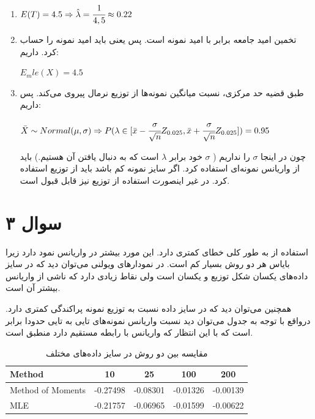 \documentclass[12pt]{article}
\begin{document}
\begin{enumerate}
	\item 
	\begin{latin}
		$
		E(T) = 4.5 \Rightarrow \hat{\lambda} = \cfrac{1}{4,5}  \approx 0.22
		$
	\end{latin}
	\item 
		تخمین امید جامعه برابر با امید نمونه است. پس یعنی باید امید نمونه را حساب کرد. داریم:
	\begin{latin}
		$
		E_mle(X) = 4.5
		$
	\end{latin}
	\item 
	طبق قضیه حد مرکزی، نسبت میانگین نمونه‌ها از توزیع نرمال پیروی می‌کند. پس داریم:
	\begin{latin}
		$
		\bar{X} \sim Normal(\mu, \sigma) \Rightarrow P(\lambda \in [\bar{x} - \cfrac{\sigma}{\sqrt{n}} Z_{0.025},  \bar{x} + \cfrac{\sigma}{\sqrt{n}} Z_{0.025}]) = 0.95
		$
	\end{latin}
	چون در اینجا 
	$\sigma$
	را نداریم (
	$\sigma$ خود برابر $\lambda$ است که به دنبال یافتن آن هستیم.)
	باید از واریانس نمونه‌ای استفاده کرد. اگر سایز نمونه کم باشد باید از توزیع 
	استفاده کرد. در غیر اینصورت استفاده از توزیع 
	نیز قابل قبول است.
\end{enumerate}
\section{سوال ۳}
استفاده از 
به طور کلی خطای کمتری دارد. این مورد بیشتر در واریانس نمود دارد زیرا بایاس هر دو روش بسیار کم است. در نمودارهای ویولنی می‌توان دید که در سایز داده‌های یکسان شکل توزیع 
و
یکسان است ولی 
نقاط 
زیادی دارد که ناشی از واریانس بیشتر آن است.

همچنین می‌توان دید که در سایز داده 
نسبت به 
توزیع نمونه پراکندگی کمتری دارد. درواقع با توجه به جدول  می‌توان دید نسبت واریانس نمونه‌های  تایی به  تایی حدودا برابر 
است که با این انتظار که واریانس با 
رابطه مستقیم دارد منطبق است.
\begin{table}[h!]
	\centering
	\caption{مقایسه  بین دو روش در سایز داده‌های مختلف}
	\begin{latin}
	\label{tab:bias-comparison}
	\begin{tabular}{lcccc}
		\textbf{Method} & \textbf{10} & \textbf{25} & \textbf{100} & \textbf{200} \\
		\hline
		Method of Moments & -0.27498 & -0.08301 & -0.01326 & -0.00139 \\
		MLE & -0.21757 & -0.06965 & -0.01599 & -0.00622 \\
	\end{tabular}
		\end{latin}
\end{table}
\end{document}

